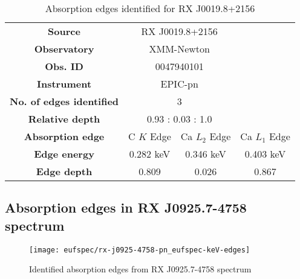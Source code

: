			\renewcommand{\arraystretch}{1.5}
			\begin{table}[!htb]
				\centering
				\caption{Absorption edges identified for RX J0019.8+2156}
				\label{tab:absedge-rx-j0019}
				\begin{tabular}{cccc}
					\hline
					\textbf{Source} & \multicolumn{2}{c}{RX J0019.8+2156} & {} \\
					\textbf{Observatory} & \multicolumn{2}{c}{XMM-Newton}& {} \\
					\textbf{Obs. ID} & \multicolumn{2}{c}{0047940101}& {} \\
					\textbf{Instrument} & \multicolumn{2}{c}{EPIC-pn}& {} \\
					\textbf{No. of edges identified} & \multicolumn{2}{c}{3}& {} \\
					\textbf{Relative depth} & \multicolumn{2}{c}{0.93 : 0.03 : 1.0} & {} \\ \hline
					\textbf{Absorption edge} & {C $K$ Edge} & {Ca $L_2$ Edge} & {Ca $L_1$ Edge} \\
					\textbf{Edge energy} & {0.282 keV} & {0.346 keV} & {0.403 keV} \\
					\textbf{Edge depth} & {0.809} & {0.026} & {0.867} \\ \hline
				\end{tabular}
			\end{table}
			\renewcommand{\arraystretch}{2.2}
		
		
		\newpage
		\subsection*{Absorption edges in RX J0925.7-4758 spectrum}
			\begin{figure}[h!]
				\centering
				\texttt{[image: eufspec/rx-j0925-4758-pn\_eufspec-keV-edges]}
				\caption{Identified absorption edges from RX J0925.7-4758 spectrum}
				\label{result:absedge-rx-j0925}
			\end{figure}
			
